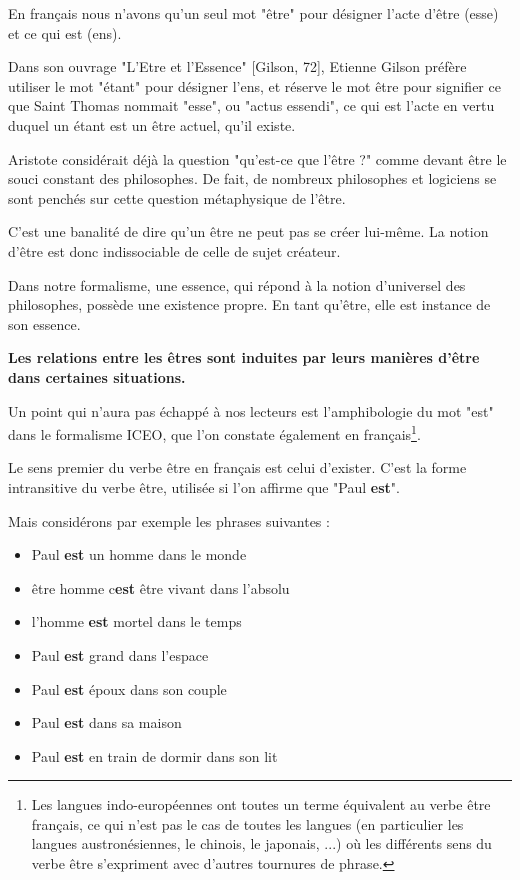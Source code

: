 \documentclass[a4paper, 12pt, openright, french]{book}
\begin{document}
En français nous n'avons qu'un seul mot
"être" pour désigner l'acte d'être
(esse) et ce qui est (ens).

Dans son ouvrage "L'Etre et l'Essence"
{[}Gilson, 72{]}, Etienne Gilson préfère utiliser le mot "étant" pour
désigner l'ens, et réserve le mot être pour signifier ce
que Saint Thomas nommait "esse", ou "actus essendi", ce qui est
l'acte en vertu duquel un étant est un être actuel,
qu'il existe.

Aristote considérait déjà la question "qu'est-ce que
l'être ?" comme devant être le souci constant des
philosophes. De fait, de nombreux philosophes et logiciens se sont
penchés sur cette question métaphysique de l'être.

C'est une banalité de dire qu'un être ne
peut pas se créer lui-même. La notion d'être est donc
indissociable de celle de sujet créateur.

Dans notre formalisme, une essence, qui répond à la notion
d'universel des philosophes, possède une existence propre. En tant
qu'être, elle est instance de son essence.

\textbf {Les relations entre les êtres sont induites par leurs manières
d'être dans certaines situations.}

Un point qui n'aura pas échappé à nos lecteurs est
l'amphibologie du mot "est" dans le formalisme ICEO, que
l'on constate également en français\footnote{ Les langues indo-européennes ont toutes un terme
	équivalent au verbe être français, ce qui n'est pas le
	cas de toutes les langues (en particulier les langues austronésiennes,
	le chinois, le japonais, ...) où les différents sens du verbe être
	s'expriment avec d'autres tournures de
	phrase.}.

Le sens premier du verbe être en français est celui
d'exister. C'est la forme intransitive
du verbe être, utilisée si l'on affirme que "Paul
\textbf{est}".

Mais considérons par exemple les phrases suivantes :

\begin{itemize}
\item
  Paul \textbf{est} un homme dans le monde
\item
  être homme c\textquotesingle{}\textbf{est} être vivant dans
  l'absolu
\item
  l'homme \textbf{est} mortel dans le temps
\item
  Paul \textbf{est} grand dans l'espace
\item
  Paul \textbf{est} époux dans son couple
\item
  Paul \textbf{est} dans sa maison
\item
  Paul \textbf{est} en train de dormir dans son lit
\end{itemize}
\end{document}
